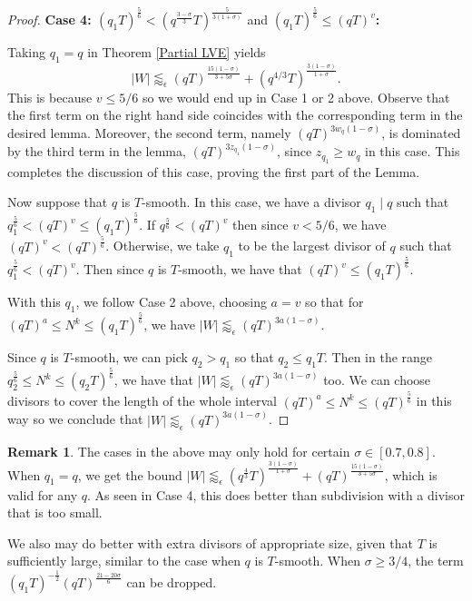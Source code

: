 \documentclass[12pt]{amsart}
\theoremstyle{definition}
\newtheorem{remark}[theorem]{Remark}
\theoremstyle{plain}
\theoremstyle{remark}
\numberwithin{equation}{section}
\numberwithin{theorem}{section}
\numberwithin{equation}{section}
\begin{document}
\begin{proof}
		\noindent \textbf{Case 4: $(q_1T)^{\frac{5}{6}}<(q^{\frac{3-\sigma}{3}}T)^{\frac{5}{3(1+\sigma)}}$} and $(q_1T)^{\frac{5}{6}} \leq (qT)^v$\textbf{:}
		
		Taking $q_1=q$ in Theorem \ref{Partial LVE} yields 
		\begin{equation*}
			|W| \lessapprox_{\epsilon} (qT)^{\frac{15(1-\sigma)}{3+5\sigma}} + (q^{4/3}T)^{\frac{3(1-\sigma)}{1+\sigma}}.
		\end{equation*}
		This is because $v \leq 5/6$ so we would end up in Case 1 or 2 above.
		Observe that the first term on the right hand side coincides with the corresponding term in the desired lemma. Moreover, the second term, namely $(qT)^{3w_q(1-\sigma)}$, is dominated by the third term in the lemma, $(qT)^{3z_{q_{1}}(1-\sigma)}$, since $z_{q_{1}} \geq w_q$ in this case. This completes the discussion of this case, proving the first part of the Lemma.
		
		Now suppose that $q$ is $T$-smooth. In this case, we have a divisor $q_1 \mid q$ such that $q_1^{\frac{5}{6}} < (qT)^v \leq (q_1T)^{\frac{5}{6}}$. If $q^{\frac{5}{6}} < (qT)^{v}$ then since $v<5/6$, we have $(qT)^v < (qT)^{\frac{5}{6}}$. Otherwise, we take $q_1$ to be the largest divisor of $q$ such that $q_1^{\frac{5}{6}} <(qT)^v$. Then since $q$ is $T$-smooth, we have that $(qT)^v {\leq} (q_1T)^{\frac{5}{6}}$.
		
		With this $q_1$, we follow Case 2 above, choosing $a=v$ so that for $(qT)^a \leq N^k \leq (q_1T)^{\frac{5}{6}}$, we have $|W| \lessapprox_{\epsilon} (qT)^{3a(1-\sigma)}$. 
		
		Since $q$ is $T$-smooth, we can pick $q_2>q_1$ so that $q_2 \leq q_1T$. Then in the range $q_2^{\frac{5}{6}} \leq N^k \leq (q_2T)^{\frac{5}{6}}$, we have that $|W| \lessapprox_{\epsilon} (qT)^{3a(1-\sigma)}$ too. We can choose divisors to cover the length of the whole interval $(qT)^a \leq N^k \leq (qT)^{\frac{5}{6}}$ in this way so we conclude that $|W| \lessapprox_{\epsilon} (qT)^{3a(1-\sigma)}$.
	\end{proof}
	\begin{remark}
		The cases in the above may only hold for certain $\sigma \in [0.7,0.8]$. When $q_1=q$, we get the bound $|W| \lessapprox_{\epsilon} (q^{\frac{4}{3}}T)^{\frac{3(1-\sigma)}{1+\sigma}}+(qT)^{\frac{15(1-\sigma)}{3+5\sigma}}$, which is valid for any $q$. As seen in Case 4, this does better than subdivision with a divisor that is too small.
		
		We also may do better with extra divisors of appropriate size, given that $T$ is sufficiently large, similar to the case when $q$ is $T$-smooth. When $\sigma \geq 3/4$, the term $(q_1T)^{-\frac{1}{2}}(qT)^{\frac{21-20\sigma}{6}}$ can be dropped. 
	\end{remark}
\end{document}
